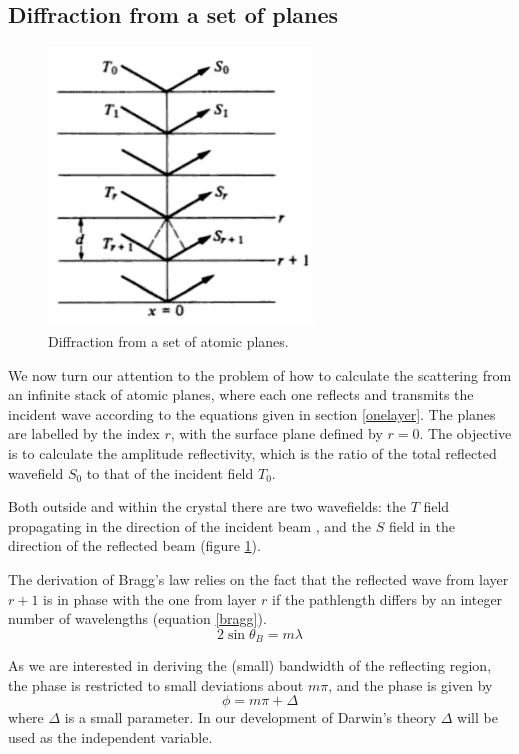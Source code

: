 \documentclass[12pt,oneside,notitlepage,abstracton,a4paper]{scrartcl}
\begin{document}
\subsection{Diffraction from a set of planes}
\begin{figure}
\vspace{-40pt}
\begin{center}
\includegraphics[width=7cm]{pics/picture3.png}
\caption{Diffraction from a set of atomic planes.}
\label{pic3}
\end{center}
\end{figure}We now turn our attention to the problem of how to calculate the scattering from an infinite stack of atomic planes, where each one reflects and transmits the incident wave according to the equations given in section \ref{onelayer}. The planes are labelled by the index $r$, with the surface plane defined by $r=0$. The objective is to calculate the amplitude reflectivity, which is the ratio of the total reflected wavefield $S_0$ to that of the incident field $T_0$.

Both outside and within the crystal there are two wavefields: the $T$ field propagating in the direction of the incident beam , and the $S$ field in the direction of the reflected beam (figure \ref{pic3}).




The derivation of Bragg's law relies on the fact that the reflected wave from layer $r+1$ is in phase with the one from layer $r$ if the pathlength differs by an integer number of wavelengths (equation \ref{bragg}). 
\begin{equation}\label{bragg}
 2\sin{\theta_B}=m\lambda
\end{equation}

As we are interested in deriving the (small) bandwidth of the reflecting region, the phase is restricted to small deviations about $m\pi$, and the phase is given by
\begin{equation}\label{phase}
 \phi=m\pi+\Delta
\end{equation}
where $\Delta$ is a small parameter. In our development of Darwin's theory $\Delta$ will be used as the independent variable.
\end{document}
